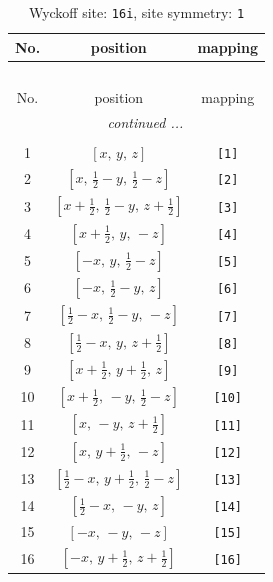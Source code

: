 \documentclass[fleqn,8pt]{jsarticle}
\begin{document}
\begin{longtable}{ccc}
\caption{Wyckoff site: {\tt 16i}, site symmetry: {\tt 1}}
 \\
 \hline \hline
No. & position & mapping \\ \hline \endfirsthead

\multicolumn{2}{l}{\tablename\ \thetable{}} \\
 \hline \hline
No. & position & mapping \\ \hline \endhead

 \hline \hline
\multicolumn{2}{r}{\footnotesize\it continued ...} \\ \endfoot

 \hline \hline
\multicolumn{2}{r}{} \\ \endlastfoot

1 & $\left[ x,\, y,\, z \right]$ & {\tt [1]} \\ \hline
2 & $\left[ x,\, \frac{1}{2} - y,\, \frac{1}{2} - z \right]$ & {\tt [2]} \\ \hline
3 & $\left[ x + \frac{1}{2},\, \frac{1}{2} - y,\, z + \frac{1}{2} \right]$ & {\tt [3]} \\ \hline
4 & $\left[ x + \frac{1}{2},\, y,\, - z \right]$ & {\tt [4]} \\ \hline
5 & $\left[ - x,\, y,\, \frac{1}{2} - z \right]$ & {\tt [5]} \\ \hline
6 & $\left[ - x,\, \frac{1}{2} - y,\, z \right]$ & {\tt [6]} \\ \hline
7 & $\left[ \frac{1}{2} - x,\, \frac{1}{2} - y,\, - z \right]$ & {\tt [7]} \\ \hline
8 & $\left[ \frac{1}{2} - x,\, y,\, z + \frac{1}{2} \right]$ & {\tt [8]} \\ \hline
9 & $\left[ x + \frac{1}{2},\, y + \frac{1}{2},\, z \right]$ & {\tt [9]} \\ \hline
10 & $\left[ x + \frac{1}{2},\, - y,\, \frac{1}{2} - z \right]$ & {\tt [10]} \\ \hline
11 & $\left[ x,\, - y,\, z + \frac{1}{2} \right]$ & {\tt [11]} \\ \hline
12 & $\left[ x,\, y + \frac{1}{2},\, - z \right]$ & {\tt [12]} \\ \hline
13 & $\left[ \frac{1}{2} - x,\, y + \frac{1}{2},\, \frac{1}{2} - z \right]$ & {\tt [13]} \\ \hline
14 & $\left[ \frac{1}{2} - x,\, - y,\, z \right]$ & {\tt [14]} \\ \hline
15 & $\left[ - x,\, - y,\, - z \right]$ & {\tt [15]} \\ \hline
16 & $\left[ - x,\, y + \frac{1}{2},\, z + \frac{1}{2} \right]$ & {\tt [16]} \\
\end{longtable}
\end{document}
